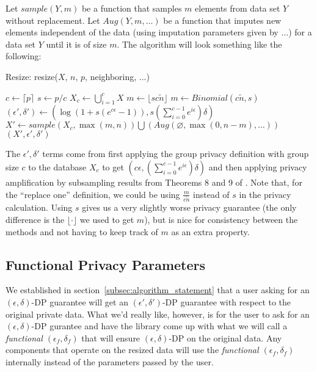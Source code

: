 \documentclass[11pt]{scrartcl} %
\begin{document}
Let $sample(Y, m)$ be a function that samples $m$ elements from data set $Y$ without replacement. 
Let $Aug(Y, m, \hdots)$ be a function that imputes new elements independent of the data (using imputation parameters given by $\hdots$) for a data set $Y$ until it is of size $m$. 
The algorithm will look something like the following:
\begin{algorithm}[H]
    \caption{Resize: resize($X$, $n$, $p$, neighboring, ...)}
    \label{alg:gen_resize}
    \begin{algorithmic}[1]
        \State $c \gets \lceil p \rceil$ 
        \State $s \gets p/c$ 
        \State $X_c \gets \bigcup_{i=1}^{c}X$ 
            \State $m \gets \lfloor sc\tilde{n} \rfloor$ 
            \State $m \gets Binomial(c\tilde{n}, s)$ 
        \EndIf
        \State $(\epsilon', \delta') \gets \left(\log\left(1+s\left(e^{c\epsilon}-1\right) \right), s\left(\sum_{i=0}^{c-1}e^{i \epsilon}\right)\delta \right)$ 
        \State $X' \gets sample\left( X_c, \max(m, n) \right) \bigcup \left( Aug(\varnothing, \max(0, n - m), \hdots) \right)$
        \\ \Return $(X', \epsilon', \delta')$
    \end{algorithmic}
\end{algorithm}

The $\epsilon', \delta'$ terms come from first applying the group privacy definition with group size $c$ to the 
database $X_c$ to get $\left(c\epsilon, \left(\sum_{i=0}^{c-1}e^{i \epsilon}\right)\delta \right)$ \cite{Vad17}
and then applying privacy amplification by subsampling results from Theorems 8 and 9 of \cite{BBG18}. 
Note that, for the ``replace one'' definition, we could be using $\frac{m}{c\tilde{n}}$ instead of $s$ in the privacy calculation. Using $s$ gives us a very slightly 
worse privacy guarantee (the only difference is the $\lfloor \cdot \rfloor$ we used to get $m$), but is nice for 
consistency between the methods and not having to keep track of $m$ as an extra property.

\subsection{Functional Privacy Parameters}
We established in section~\ref{subsec:algorithm_statement} that a user asking for an $(\epsilon, \delta)$-DP guarantee will get an 
$(\epsilon', \delta')$-DP guarantee with respect to the original private data. What we'd really like, however, is for the user to ask for an $(\epsilon, \delta)$-DP 
gurantee and have the library come up with what we will call a \emph{functional $(\epsilon_f, \delta_f)$} that will ensure $(\epsilon, \delta)$-DP 
on the original data. Any components that operate on the resized data will use the \emph{functional $(\epsilon_f, \delta_f)$} internally instead of 
the parameters passed by the user.
\end{document}
